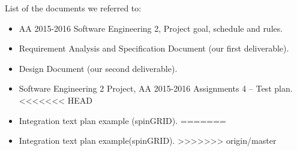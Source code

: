 List of the documents we referred to:
\begin{itemize}
    \item AA 2015-2016 Software Engineering 2, Project goal, schedule and rules.
    \item Requirement Analysis and Specification Document (our first deliverable).
    \item Design Document (our second deliverable).
    \item Software Engineering 2 Project, AA 2015-2016 Assignments 4 – Test plan.
<<<<<<< HEAD
    \item Integration text plan example (spinGRID).
=======
    \item Integration text plan example(spinGRID).
>>>>>>> origin/master
\end{itemize}
